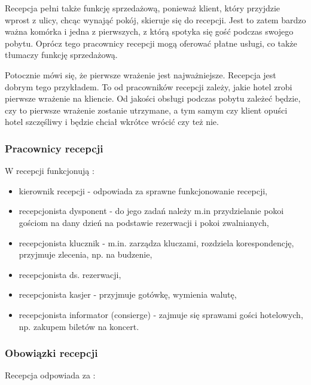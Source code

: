 \documentclass[a4paper,onecolumn,oneside,11pt,wide,floatssmall]{mwrep}
\theoremstyle{definition}
\theoremstyle{plain}%
\theoremstyle{remark}
\begin{document}
Recepcja pełni także funkcję sprzedażową, ponieważ klient, 
który przyjdzie wprost z ulicy, chcąc wynająć pokój, skieruje się do recepcji. 
Jest to zatem  bardzo ważna komórka i jedna z pierwszych, z którą spotyka 
się gość podczas swojego pobytu. Oprócz tego pracownicy recepcji mogą 
oferować płatne usługi, co także tłumaczy funkcję sprzedażową.

Potocznie mówi się, że pierwsze wrażenie jest najważniejsze. Recepcja jest 
dobrym tego przykładem. To od pracowników recepcji zależy, jakie hotel zrobi 
pierwsze wrażenie na kliencie. Od jakości obsługi podczas pobytu zależeć 
będzie, czy to pierwsze wrażenie zostanie utrzymane, a tym samym 
czy klient opuści hotel szczęśliwy i będzie chciał wkrótce wrócić czy też
 nie.


\subsubsection{Pracownicy recepcji}
W recepcji funkcjonują \cite{OrgaDzialHot}:

\begin{itemize}
  \item kierownik recepcji - odpowiada za sprawne 
  funkcjonowanie recepcji,
  \item recepcjonista dysponent - do jego zadań należy m.in przydzielanie 
  pokoi gościom na dany dzień na podstawie rezerwacji i pokoi zwalnianych,
  \item recepcjonista klucznik - m.in. zarządza kluczami, rozdziela 
  korespondencję, przyjmuje zlecenia, np. na budzenie,
  \item recepcjonista ds. rezerwacji,
  \item recepcjonista kasjer - przyjmuje gotówkę, wymienia walutę,
  \item recepcjonista informator (consierge) - zajmuje się sprawami gości 
  hotelowych, np. zakupem biletów na koncert.
\end{itemize}

\subsubsection{Obowiązki recepcji} 
Recepcja odpowiada za \cite{OrgaDzialHot}:
\end{document}
